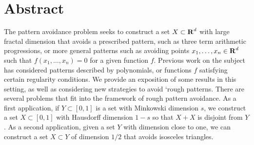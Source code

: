 
\chapter{Abstract}


The pattern avoidance problem seeks to construct a set $X \subset \operatorname{\mathbf{R}}^d$ with large fractal dimension that avoids a prescribed pattern, such as three term arithmetic progressions, or more general patterns such as avoiding points $x_1, \dots, x_n \in \operatorname{\mathbf{R}}^d$ such that $f(x_1, \dots, x_n) = 0$ for a given function $f$. Previous work on the subject has considered patterns described by polynomials, or functions $f$ satisfying certain regularity conditions. We provide an exposition of some results in this setting, as well as considering new strategies to avoid `rough patterns. There are several problems that fit into the framework of rough pattern avoidance. As a first application, if $Y\subset[0,1]$ is a set with Minkowski dimension $s$, we construct a set $X\subset[0,1]$ with Hausdorff dimension $1-s$ so that $X+X$ is disjoint from $Y$. As a second application, given a set $Y$ with dimension close to one, we can construct a set $X\subset Y$ of dimension $1/2$ that avoids isosceles triangles.